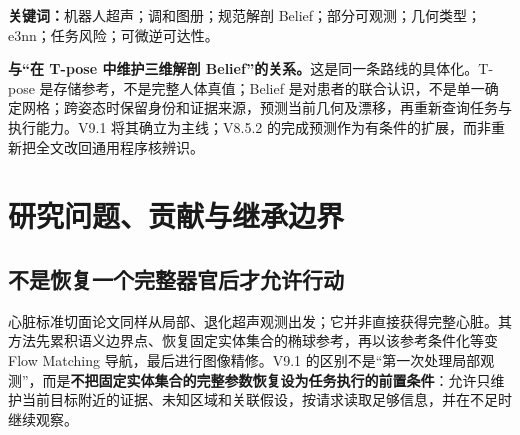 \documentclass[UTF8,fontset=fandol,11pt,a4paper]{ctexart}
\theoremstyle{plain}
\theoremstyle{definition}
\theoremstyle{remark}
\numberwithin{equation}{section}
\begin{document}
\begin{abstract}
机器人超声中的知识复用不应等同于重放旧探头轨迹，身体中心地址也不应被误认为真实内部器官的位置。本文提出 Anatomical GPS V9.1：在规范参考姿态上维护患者特异、可更新的分型概率解剖 Belief，将目标身份、几何关联、方向不确定性、视角依赖成像信息与证据来源分开表达。调和图册提供跨视角索引及当前几何微分；显式运输区分切向量、协向量与二阶张量；轻量条件残差描述内部目标相对名义身体映射的漂移。局部图像通过不确定空间关联与分型特征提升进入共享状态，e3nn 用于学习符合旋转类型的提议与关系，而不替代概率更新或真实执行约束。同一状态向声明的短轴、长轴与局部复查查询输出目标矩、几何风险和候选观察条件，再由 dIRD 引导的有限实现搜索与图像／接触控制完成实际采集。理论给出分型更新的坐标一致性、局部二次任务查询的矩闭合及方向二阶信息的必要性见证、非刚性运输后矩不闭合的反例、统一矩误差下优化后仍有效的风险验收，以及度量一致的能力引导。三类主实验分别检验局部概率 Lift、共享证据跨请求查询、能力条件化真实实现。形变只作为有条件残差模型，不要求材料辨识、完整器官重建或大量医生轨迹示教。本文区分已知工具、拟议方法增量、模型内结论与仍需实证建立的价值。
\end{abstract}
\noindent\textbf{关键词：}机器人超声；调和图册；规范解剖 Belief；部分可观测；几何类型；e3nn；任务风险；可微逆可达性。

\begin{corebox}
\textbf{与“在 T-pose 中维护三维解剖 Belief”的关系。}这是同一条路线的具体化。T-pose 是存储参考，不是完整人体真值；Belief 是对患者的联合认识，不是单一确定网格；跨姿态时保留身份和证据来源，预测当前几何及漂移，再重新查询任务与执行能力。V9.1 将其确立为主线；V8.5.2 的完成预测作为有条件的扩展，而非重新把全文改回通用程序核辨识。
\end{corebox}
\setcounter{tocdepth}{1}\tableofcontents\clearpage

\section{研究问题、贡献与继承边界}
\label{sec:problem}
\subsection{不是恢复一个完整器官后才允许行动}
心脏标准切面论文同样从局部、退化超声观测出发；它并非直接获得完整心脏。其方法先累积语义边界点、恢复固定实体集合的椭球参考，再以该参考条件化等变 Flow Matching 导航，最后进行图像精修\cite{cardiac}。V9.1 的区别不是“第一次处理局部观测”，而是\textbf{不把固定实体集合的完整参数恢复设为任务执行的前置条件}：允许只维护当前目标附近的证据、未知区域和关联假设，按请求读取足够信息，并在不足时继续观察。
\end{document}
